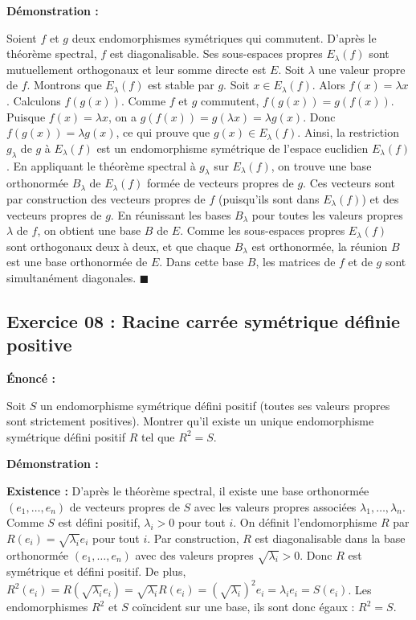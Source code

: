 \documentclass[11pt,a4paper]{article}
\begin{document}
\textbf{Démonstration :}


Soient $f$ et $g$ deux endomorphismes symétriques qui commutent. D'après le théorème spectral, $f$ est diagonalisable. Ses sous-espaces propres $E_\lambda(f)$ sont mutuellement orthogonaux et leur somme directe est $E$.
Soit $\lambda$ une valeur propre de $f$. Montrons que $E_\lambda(f)$ est stable par $g$.
Soit $x \in E_\lambda(f)$. Alors $f(x) = \lambda x$.
Calculons $f(g(x))$. Comme $f$ et $g$ commutent, $f(g(x)) = g(f(x))$.
Puisque $f(x) = \lambda x$, on a $g(f(x)) = g(\lambda x) = \lambda g(x)$.
Donc $f(g(x)) = \lambda g(x)$, ce qui prouve que $g(x) \in E_\lambda(f)$.
Ainsi, la restriction $g_\lambda$ de $g$ à $E_\lambda(f)$ est un endomorphisme symétrique de l'espace euclidien $E_\lambda(f)$.
En appliquant le théorème spectral à $g_\lambda$ sur $E_\lambda(f)$, on trouve une base orthonormée $B_\lambda$ de $E_\lambda(f)$ formée de vecteurs propres de $g$.
Ces vecteurs sont par construction des vecteurs propres de $f$ (puisqu'ils sont dans $E_\lambda(f)$) et des vecteurs propres de $g$.
En réunissant les bases $B_\lambda$ pour toutes les valeurs propres $\lambda$ de $f$, on obtient une base $B$ de $E$.
Comme les sous-espaces propres $E_\lambda(f)$ sont orthogonaux deux à deux, et que chaque $B_\lambda$ est orthonormée, la réunion $B$ est une base orthonormée de $E$.
Dans cette base $B$, les matrices de $f$ et de $g$ sont simultanément diagonales. $\blacksquare$

\subsection*{Exercice 08 : Racine carrée symétrique définie positive}


\textbf{Énoncé :}


Soit $S$ un endomorphisme symétrique défini positif (toutes ses valeurs propres sont strictement positives). Montrer qu'il existe un unique endomorphisme symétrique défini positif $R$ tel que $R^2 = S$.

\textbf{Démonstration :}


\textbf{Existence :}
D'après le théorème spectral, il existe une base orthonormée $(e_1, \dots, e_n)$ de vecteurs propres de $S$ avec les valeurs propres associées $\lambda_1, \dots, \lambda_n$. Comme $S$ est défini positif, $\lambda_i > 0$ pour tout $i$.
On définit l'endomorphisme $R$ par $R(e_i) = \sqrt{\lambda_i} e_i$ pour tout $i$.
Par construction, $R$ est diagonalisable dans la base orthonormée $(e_1, \dots, e_n)$ avec des valeurs propres $\sqrt{\lambda_i} > 0$. Donc $R$ est symétrique et défini positif.
De plus, $R^2(e_i) = R(\sqrt{\lambda_i} e_i) = \sqrt{\lambda_i} R(e_i) = (\sqrt{\lambda_i})^2 e_i = \lambda_i e_i = S(e_i)$.
Les endomorphismes $R^2$ et $S$ coïncident sur une base, ils sont donc égaux : $R^2 = S$.
\end{document}
